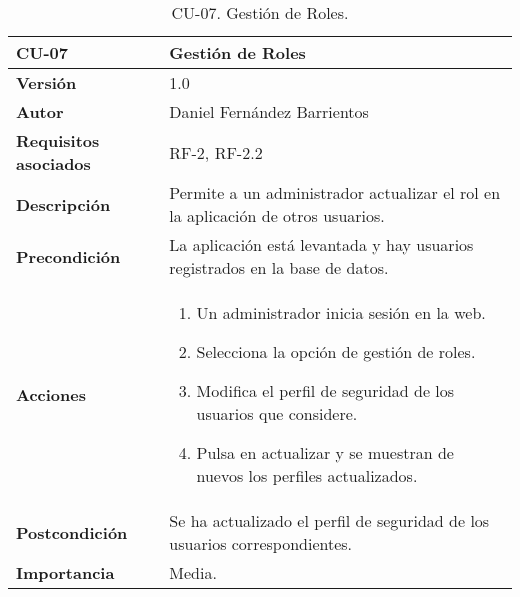 \begin{table}[p]
	\centering
	\begin{tabularx}{\linewidth}{ p{} p{} }
		\toprule
		\textbf{CU-07}    & \textbf{Gestión de Roles}\\
		\toprule
		\textbf{Versión}              & 1.0    \\
		\textbf{Autor}                & Daniel Fernández Barrientos \\
		\textbf{Requisitos asociados} & RF-2, RF-2.2 \\
		\textbf{Descripción}          & Permite a un administrador actualizar el rol en la aplicación de otros usuarios. \\
		\textbf{Precondición}         & La aplicación está levantada y hay usuarios registrados en la base de datos. \\
		\textbf{Acciones}             &
		\begin{enumerate}
			\def\labelenumi{\arabic{enumi}.}
			\tightlist
			\item Un administrador inicia sesión en la web.
			\item Selecciona la opción de gestión de roles.
			\item Modifica el perfil de seguridad de los usuarios que considere.
			\item Pulsa en actualizar y se muestran de nuevos los perfiles actualizados.
		\end{enumerate}\\
		\textbf{Postcondición}        & Se ha actualizado el perfil de seguridad de los usuarios correspondientes. \\
		\textbf{Importancia}          & Media. \\
		\bottomrule
	\end{tabularx}
	\caption{CU-07. Gestión de Roles.}
\end{table}

